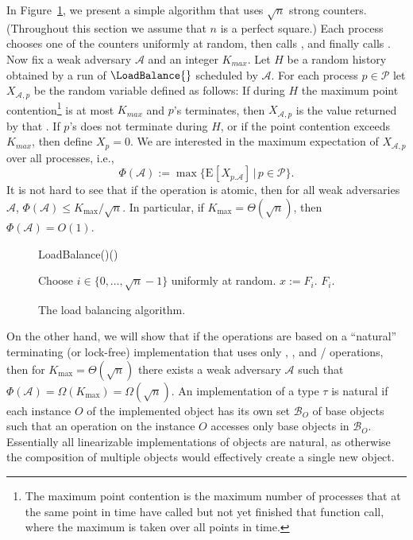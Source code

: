 \documentclass[11pt,letterpaper]{article}
\makeatletter
\providecommand{\@Exp}{{\mathrm{E}}}
\newcommand{\Exp}[2][]{\@Exp_{#1}\left[{#2}\right]}
\def\read{\text{\tt read}\xspace}
\newcommand{\xwrite}{\text{\tt write}\xspace}
\newcommand{\SC}{\text{\tt SC}\xspace}
\newcommand{\LL}{\text{\tt LL}\xspace}
\renewcommand{\AA}{\mathcal{A}}
\newcommand{\PP}{\mathcal{P}}
\makeatother
\begin{document}
In Figure~\ref{fig:loadbalance}, we present a simple algorithm that uses $\sqrt{n}$ strong counters.
(Throughout this section we assume that $n$ is a perfect square.)
Each process chooses one of the counters uniformly at random, then calls \FAI{}, and finally calls \FAD{}.
Now fix a weak adversary $\AA$ and an integer $K_{max}$.
Let $H$ be a random history obtained by a run of $\LoadBalance{}$ scheduled by $\AA$. For each process $p\in\PP$ let $X_{\AA,p}$ be the random variable defined as follows:
If during $H$ the maximum point contention\footnote{The maximum point contention is the maximum number of processes that at the same point in time have called \LoadBalance{} but not yet finished that function call, where the maximum is taken over all points in time.}
is at most $K_{max}$ and $p$'s \FAI{} terminates, then $X_{\AA,p}$ is the value returned by that \FAI{}.
If $p$'s \FAI{} does not terminate during $H$, or if the point contention exceeds $K_{max}$, then define $X_p=0$.
We are interested in the maximum expectation of $X_{\AA,p}$  over all processes, i.e.,
\begin{displaymath}
  \Phi(\AA):=\max\bigl\{\Exp{X_{p.\AA}}\,|\,p\in\PP\bigr\}.
\end{displaymath}
It is not hard to see that if the \FAI{} operation is atomic, then for all weak adversaries $\AA$, $\Phi(\AA)\leq K_{\max}/\sqrt{n}$.
In particular, if $K_{\max}=\Theta(\sqrt{n})$, then $\Phi(\AA)=O(1)$.

  \begin{figure}[htbp] \begin{function}[H]
    \caption{LoadBalance()()}
    Choose $i\in\{0,\dots,\sqrt{n}-1\}$ uniformly at random.\label{LoadBalance:random_choice}\;
    $x:=F_i$.\FAI{}\;
    $F_i$.\FAD{}\;
    \;
  \end{function}
  \caption{The load balancing algorithm.}\label{fig:loadbalance}
  \end{figure}



On the other hand, we will show that if the \FAI{} operations are based on a ``natural'' terminating (or lock-free) implementation that uses only \read, \xwrite, and \LL/\SC operations, then for $K_{\max}=\Theta(\sqrt{n})$ there exists a weak adversary $\AA$ such that $\Phi(\AA)=\Omega(K_{\max})=\Omega(\sqrt{n})$.
An implementation of a type $\tau$ is natural if each instance $O$ of the implemented object has its own set $\mathcal{B}_O$ of base objects such that an operation on the instance $O$ accesses only base objects in $\mathcal{B}_O$.
Essentially all linearizable implementations of objects are natural, as otherwise the composition of multiple objects would effectively create a single new object.
\end{document}
